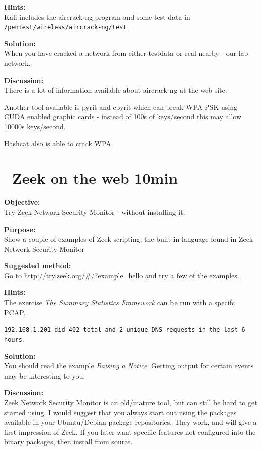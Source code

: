 \documentclass[a4paper,11pt,notitlepage]{report}
\begin{document}
{\bf Hints:}\\
Kali includes the aircrack-ng program and some test data in \\
\verb+/pentest/wireless/aircrack-ng/test+

{\bf Solution:}\\
When you have cracked a network from either testdata or real nearby - our lab network.

{\bf Discussion:}\\
There is a lot of information available about aircrack-ng at the web site:\\

Another tool available is pyrit and cpyrit which can break WPA-PSK using CUDA enabled graphic cards - instead of 100s of keys/second this may allow 10000s keys/second.

Hashcat also is able to crack WPA 





\chapter{\faExclamationTriangle\ Zeek on the web 10min}
\label{ex:zeekweb}


{\bf Objective:} \\
Try Zeek Network Security Monitor - without installing it.


{\bf Purpose:}\\
Show a couple of examples of Zeek scripting, the built-in language found in Zeek Network Security Monitor


{\bf Suggested method:}\\
Go to \url{http://try.zeek.org/#/?example=hello} and try a few of the examples.

{\bf Hints:}\\
The exercise
\emph{The Summary Statistics Framework} can be run with a specifc PCAP.

\verb+192.168.1.201 did 402 total and 2 unique DNS requests in the last 6 hours.+

{\bf Solution:}\\
You should read the example \emph{Raising a Notice}. Getting output for certain events may be interesting to you.


{\bf Discussion:}\\
Zeek Network Security Monitor is an old/mature tool, but can still be hard to get started using. I would suggest that you always start out using the packages available in your Ubuntu/Debian package repositories.  They work, and will give a first impression of Zeek. If you later want specific features not configured into the binary packages, then install from source.
\end{document}
